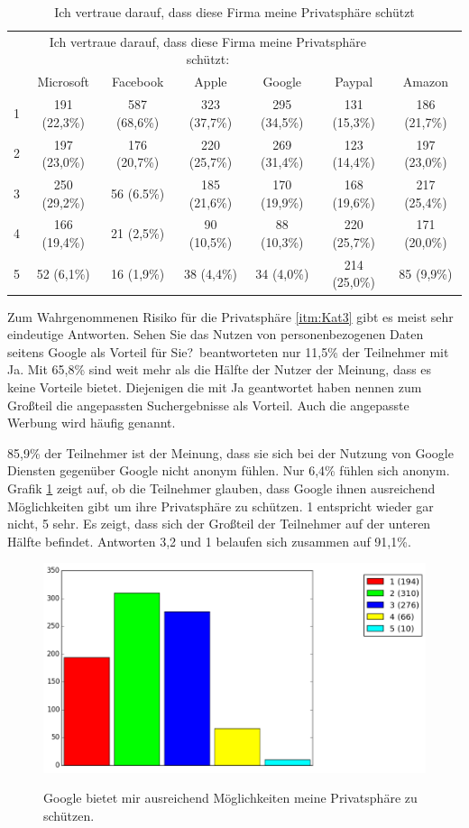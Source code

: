 \begin{table}
	\begin{tabular}[]{ c || c | c | c | c | c | c}
	& \multicolumn{5}{c}{Ich vertraue darauf, dass diese Firma meine Privatsphäre schützt:}\\
	& Microsoft & Facebook & Apple & Google & Paypal & Amazon\\ \hline \hline
	1 &191 (22,3\%)&587 (68,6\%)&323 (37,7\%)&295 (34,5\%)&131 (15,3\%)&186 (21,7\%)\\ \hline
	2 &197 (23,0\%)&176 (20,7\%)&220 (25,7\%)&269 (31,4\%)&123 (14,4\%)&197 (23,0\%)\\ \hline
	3 &250 (29,2\%)&56 (6.5\%)&185 (21,6\%)&170 (19,9\%)&168 (19,6\%)&217 (25,4\%)\\ \hline
	4 &166 (19,4\%)&21 (2,5\%)&90 (10,5\%)&88 (10,3\%)&220 (25,7\%)&171 (20,0\%)\\ \hline
	5 &52 (6,1\%)&16 (1,9\%)&38 (4,4\%)&34 (4,0\%)&214 (25,0\%)&85 (9,9\%)\\ \hline
	\end{tabular}
	\caption{Ich vertraue darauf, dass diese Firma meine Privatsphäre schützt}\label{vertrauenothers}
\end{table}

Zum Wahrgenommenen Risiko für die Privatsphäre \ref{itm:Kat3} gibt es meist sehr eindeutige Antworten. \glqq Sehen Sie das Nutzen von personenbezogenen Daten seitens Google als Vorteil für Sie?\grqq\ beantworteten nur 11,5\% der Teilnehmer mit Ja. Mit 65,8\% sind weit mehr als die Hälfte der Nutzer der Meinung, dass es keine Vorteile bietet.
Diejenigen die mit Ja geantwortet haben nennen zum Großteil die angepassten Suchergebnisse als Vorteil. Auch die angepasste Werbung wird häufig genannt.

85,9\% der Teilnehmer ist der Meinung, dass sie sich bei der Nutzung von Google Diensten gegenüber Google nicht anonym fühlen. Nur 6,4\% fühlen sich anonym.
Grafik \ref{possibilities} zeigt auf, ob die Teilnehmer glauben, dass Google ihnen ausreichend Möglichkeiten gibt um ihre Privatsphäre zu schützen. 1 entspricht wieder gar nicht, 5 sehr. Es zeigt, dass sich der Großteil der Teilnehmer auf der unteren Hälfte befindet. Antworten 3,2 und 1 belaufen sich zusammen auf 91,1\%. 

\begin{figure}[H]
\centering
\includegraphics[scale=0.55]{images/possibilities}\\
\caption{Google bietet mir ausreichend Möglichkeiten meine Privatsphäre zu schützen.}\label{possibilities}
\end{figure}

